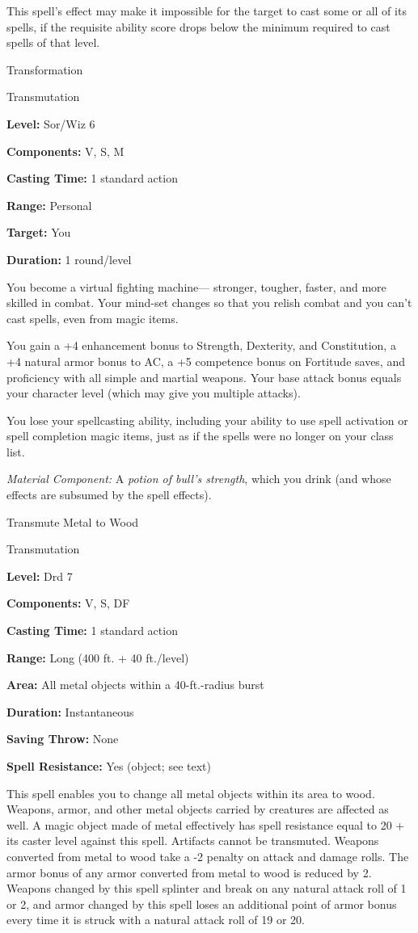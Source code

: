 \documentclass{article}
\begin{document}
This spell's effect may make it impossible for the target to cast some or all of 
its spells, if the requisite ability score drops below the minimum required to 
cast spells of that level.

\vspace{12pt}
Transformation

Transmutation

\textbf{Level:} Sor/Wiz 6

\textbf{Components:} V, S, M

\textbf{Casting Time:} 1 standard action

\textbf{Range:} Personal

\textbf{Target:} You

\textbf{Duration:} 1 round/level

You become a virtual fighting machine--- stronger, tougher, faster, and more skilled 
in combat. Your mind-set changes so that you relish combat and you can't cast spells, 
even from magic items.

You gain a +4 enhancement bonus to Strength, Dexterity, and Constitution, a +4 
natural armor bonus to AC, a +5 competence bonus on Fortitude saves, and proficiency 
with all simple and martial weapons. Your base attack bonus equals your character 
level (which may give you multiple attacks).

You lose your spellcasting ability, including your ability to use spell activation 
or spell completion magic items, just as if the spells were no longer on your class 
list.

\textit{Material Component: }A \textit{potion of bull's strength}, which you drink 
(and whose effects are subsumed by the spell effects).

\vspace{12pt}
Transmute Metal to Wood

Transmutation

\textbf{Level:} Drd 7

\textbf{Components:} V, S, DF

\textbf{Casting Time:} 1 standard action

\textbf{Range:} Long (400 ft. + 40 ft./level)

\textbf{Area:} All metal objects within a 40-ft.-radius burst

\textbf{Duration:} Instantaneous

\textbf{Saving Throw:} None

\textbf{Spell Resistance:} Yes (object; see text)

This spell enables you to change all metal objects within its area to wood. Weapons, 
armor, and other metal objects carried by creatures are affected as well. A magic 
object made of metal effectively has spell resistance equal to 20 + its caster 
level against this spell. Artifacts cannot be transmuted. Weapons converted from 
metal to wood take a -2 penalty on attack and damage rolls. The armor bonus of 
any armor converted from metal to wood is reduced by 2. Weapons changed by this 
spell splinter and break on any natural attack roll of 1 or 2, and armor changed 
by this spell loses an additional point of armor bonus every time it is struck 
with a natural attack roll of 19 or 20.
\end{document}
